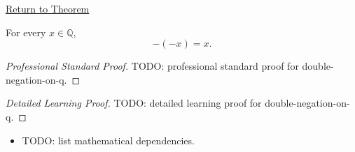 \newpage
{}
\label{prf:double-negation-on-q}

\begin{remark*}[Return]
\hyperref[cor:double-negation-on-q]{Return to Theorem}
\end{remark*}

\begin{corollary*}
For every $x\in\mathbb{Q}$,
\[
-(-x)=x.
\]
\end{corollary*}

\begin{proof}[Professional Standard Proof]
\LRAProofBodyStart
TODO: professional standard proof for double-negation-on-q.
\end{proof}

\begin{proof}[Detailed Learning Proof]
\LRAProofBodyStart
TODO: detailed learning proof for double-negation-on-q.
\end{proof}

\begin{remark*}
\end{remark*}

\begin{dependencies}
\begin{itemize}
  \item TODO: list mathematical dependencies.
\end{itemize}
\end{dependencies}

\clearpage
